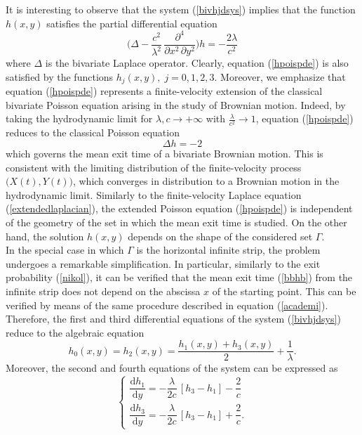 \documentclass{article}
\begin{document}
It is interesting to observe that the system (\ref{bivhjdsys}) implies that the function $h(x,y)$ satisfies the partial differential equation
\begin{equation}\label{hpoispde}\Bigg(\Delta-\frac{c^2}{\lambda^2}\,\frac{\partial^4}{\partial x^2\,\partial y^2}\Bigg)h=-\frac{2\lambda}{c^2}\end{equation}
where $\Delta$ is the bivariate Laplace operator. Clearly, equation (\ref{hpoispde}) is also satisfied by the functions $h_j(x,y),\;j=0,1,2,3$. Moreover, we emphasize that equation (\ref{hpoispde}) represents a finite-velocity extension of the classical bivariate Poisson equation arising in the study of Brownian motion. Indeed, by taking the hydrodynamic limit for $\lambda,c\to+\infty$ with $\frac{\lambda}{c^2}\to1$, equation (\ref{hpoispde}) reduces to the classical Poisson equation $$\Delta h = -2$$ which governs the mean exit time of a bivariate Brownian motion. This is consistent with the limiting distribution of the finite-velocity process $\big(X(t),Y(t)\big)$, which converges in distribution to a Brownian motion in the hydrodynamic limit. Similarly to the finite-velocity Laplace equation (\ref{extendedlaplacian}), the extended Poisson equation (\ref{hpoispde}) is independent of the geometry of the set in which the mean exit time is studied. On the other hand, the solution $h(x,y)$ depends on the shape of the considered set $\Gamma$.\\
In the special case in which $\Gamma$ is the horizontal infinite strip, the problem undergoes a remarkable simplification. In particular, similarly to the exit probability (\ref{nikol}), it can be verified that the mean exit time (\ref{bbhb}) from the infinite strip does not depend on the abscissa $x$ of the starting point. This can be verified by means of the same procedure described in equation (\ref{academi}). Therefore, the first and third differential equations of the system (\ref{bivhjdsys}) reduce to the algebraic equation
\begin{equation}\label{bivhjdsysalg}
h_0(x,y)=h_2(x,y)=\frac{h_1(x,y)+h_3(x,y)}{2}+\dfrac{1}{\lambda}.
\end{equation}
Moreover, the second and fourth equations of the system can be expressed as
\begin{equation}\label{bivhjdsysredu}
\begin{cases}
\dfrac{\mathrm{d} h_1}{\mathrm{d} y}=-\dfrac{\lambda}{2c}\,\left[h_3-h_1\right]-\dfrac{2}{c}\\[0.75em]
\dfrac{\mathrm{d} h_3}{\mathrm{d} y}=-\dfrac{\lambda}{2c}\,\left[h_3-h_1\right]+\dfrac{2}{c}.
\end{cases}\end{equation}
\end{document}
